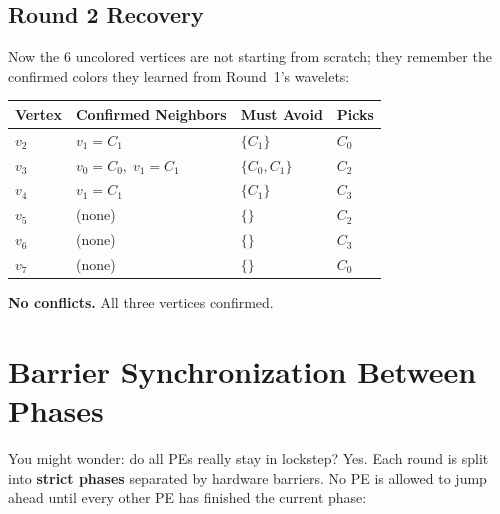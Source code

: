 \documentclass[11pt,letterpaper]{article}
\begin{document}
\subsection{Round 2 Recovery}

Now the 6 uncolored vertices are not starting from scratch; they remember the confirmed colors they learned from Round~1's wavelets:

\begin{center}
\renewcommand{\arraystretch}{1.2}
\begin{tabular}{llll}
\toprule
Vertex & Confirmed Neighbors & Must Avoid & Picks \\
\midrule
$v_2$ & $v_1{=}C_1$ & $\{C_1\}$ & $C_0$ \\
$v_3$ & $v_0{=}C_0,\; v_1{=}C_1$ & $\{C_0, C_1\}$ & $C_2$ \\
$v_4$ & $v_1{=}C_1$ & $\{C_1\}$ & $C_3$ \\
$v_5$ & (none) & $\{\}$ & $C_2$ \\
$v_6$ & (none) & $\{\}$ & $C_3$ \\
$v_7$ & (none) & $\{\}$ & $C_0$ \\
\bottomrule
\end{tabular}
\end{center}

\noindent\textbf{No conflicts.} All three vertices confirmed.

\section{Barrier Synchronization Between Phases}
\label{sec:barrier}

You might wonder: do all PEs really stay in lockstep? Yes. Each round is split into \textbf{strict phases} separated by hardware barriers. No PE is allowed to jump ahead until every other PE has finished the current phase:

\begin{center}
\end{center}
\end{document}
